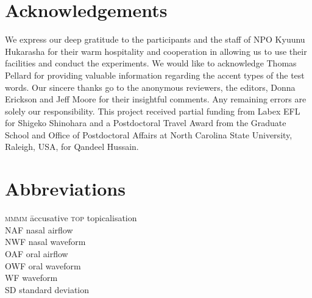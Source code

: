 \documentclass[output=paper]{langscibook}
\begin{document}
\section*{Acknowledgements}

We express our deep gratitude to the participants and the staff of NPO Kyuunu Hukarasha for their warm hospitality and cooperation in allowing us to use their facilities and conduct the experiments. We would like to acknowledge Thomas Pellard for providing valuable information regarding the accent types of the test words. Our sincere thanks go to the anonymous reviewers, the editors, Donna Erickson and Jeff Moore for their insightful comments. Any remaining errors are solely our responsibility. This project received partial funding from Labex EFL for Shigeko Shinohara and a Postdoctoral Travel Award from the Graduate School and Office of Postdoctoral Affairs at North Carolina State University, Raleigh, USA, for Qandeel Hussain.

\section*{Abbreviations}
\begin{multicols}{2}
\begin{tabbing}
\textsc{mmmm} \= accusative \kill
\textsc{top} \> topicalisation \\
NAF \> nasal airflow \\
NWF \> nasal waveform \\
OAF \> oral airflow \\
OWF \> oral waveform \\
WF \> waveform \\
SD \> standard deviation
\end{tabbing}
\end{multicols}
\end{document}
